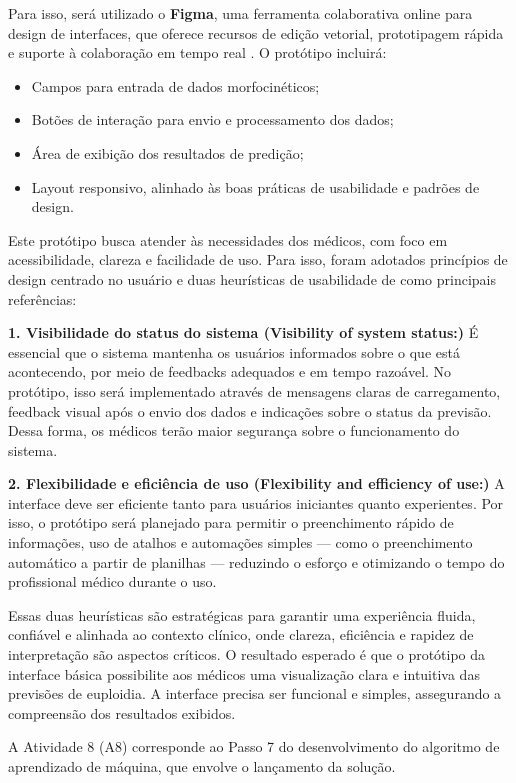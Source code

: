 Para isso, será utilizado o \textbf{Figma}, uma ferramenta colaborativa online para design de interfaces, que oferece recursos de edição vetorial, prototipagem rápida e suporte à colaboração em tempo real \cite{figma2024}. O protótipo incluirá:
\begin{itemize}
  \item Campos para entrada de dados morfocinéticos;
  \item Botões de interação para envio e processamento dos dados;
  \item Área de exibição dos resultados de predição;
  \item Layout responsivo, alinhado às boas práticas de usabilidade e padrões de design.
\end{itemize}

Este protótipo busca atender às necessidades dos médicos, com foco em acessibilidade, clareza e facilidade de uso. Para isso, foram adotados princípios de design centrado no usuário e duas heurísticas de usabilidade de  como principais referências:

\textbf{1. Visibilidade do status do sistema (Visibility of system status:)} É essencial que o sistema mantenha os usuários informados sobre o que está acontecendo, por meio de feedbacks adequados e em tempo razoável. No protótipo, isso será implementado através de mensagens claras de carregamento, feedback visual após o envio dos dados e indicações sobre o status da previsão. Dessa forma, os médicos terão maior segurança sobre o funcionamento do sistema.

\textbf{2. Flexibilidade e eficiência de uso (Flexibility and efficiency of use:)} A interface deve ser eficiente tanto para usuários iniciantes quanto experientes. Por isso, o protótipo será planejado para permitir o preenchimento rápido de informações, uso de atalhos e automações simples — como o preenchimento automático a partir de planilhas — reduzindo o esforço e otimizando o tempo do profissional médico durante o uso.

Essas duas heurísticas são estratégicas para garantir uma experiência fluida, confiável e alinhada ao contexto clínico, onde clareza, eficiência e rapidez de interpretação são aspectos críticos. O resultado esperado é que o protótipo da interface básica possibilite aos médicos uma visualização clara e intuitiva das previsões de euploidia. A interface precisa ser funcional e simples, assegurando a compreensão dos resultados exibidos.

A Atividade 8 (A8) corresponde ao Passo 7 do desenvolvimento do algoritmo de aprendizado de máquina, que envolve o lançamento da solução.

